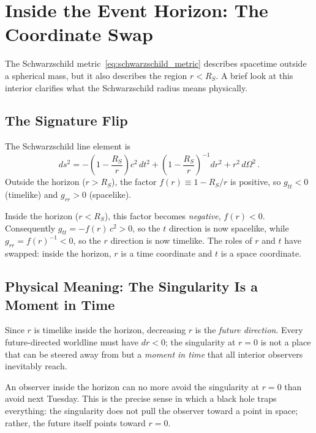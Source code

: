 \section{Inside the Event Horizon: The Coordinate Swap}
\label{sec:dg_inside_horizon}

The Schwarzschild metric~\eqref{eq:schwarzschild_metric} describes
spacetime outside a spherical mass, but it also describes
the region $r < R_S$.  A brief look at this interior clarifies
what the Schwarzschild radius means physically.

\subsection{The Signature Flip}
\label{sec:dg_signature_flip}

The Schwarzschild line element is
\[
    ds^2 = -\!\left(1 - \frac{R_S}{r}\right) c^2\, dt^2
    + \left(1 - \frac{R_S}{r}\right)^{-1} dr^2
    + r^2\, d\Omega^2 \,.
\]
Outside the horizon ($r > R_S$), the factor $f(r) \equiv 1 - R_S/r$ is
positive, so $g_{tt} < 0$ (timelike) and $g_{rr} > 0$ (spacelike).

Inside the horizon ($r < R_S$), this factor becomes \emph{negative},
$f(r) < 0$.  Consequently $g_{tt} = -f(r)\,c^2 > 0$, so the $t$ direction
is now spacelike, while $g_{rr} = f(r)^{-1} < 0$, so the $r$ direction
is now timelike.
The roles of $r$ and $t$ have swapped: inside the horizon, $r$ is a
time coordinate and $t$ is a space coordinate.

\subsection{Physical Meaning: The Singularity Is a Moment in Time}
\label{sec:dg_singularity_time}

Since $r$ is timelike inside the horizon, decreasing $r$ is the
\emph{future direction}.  Every future-directed worldline must have
$dr < 0$; the singularity at $r = 0$ is not a place that can be steered
away from but a \emph{moment in time} that all interior
observers inevitably reach.

\begin{remark}
An observer inside the horizon can no more avoid the singularity at
$r = 0$ than avoid next Tuesday.  This is the precise sense
in which a black hole traps everything: the singularity does not
pull the observer toward a point in space; rather, the future itself points
toward $r = 0$.
\end{remark}

